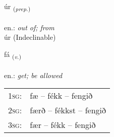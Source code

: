 \documentclass[frontgrid, backgrid]{flacards}\usepackage[]{graphicx}\usepackage[]{xcolor}
\begin{document}
\renewcommand{\blhead}{\vskip5pt {\small\bfseries\footnotesize Forsetning | Preposition }}
\renewcommand{\bcfoot}{\vskip5pt \hspace{2pt}{\small\bfseries\footnotesize 1K}}


{úr \small{\textsubscript{(\textit{prep.})}} \\[1ex]
\textphonetic{[uːr]} \\
en.: \emph{out of; from} \\  [2ex]
úr (Indeclinable)}

\renewcommand{\flhead}{\vskip5pt \fboxsep=0pt {\small\bfseries\footnotesize Sagnorð | Verb}}
\renewcommand{\fcfoot}{\vskip5pt \fboxsep=0pt \hspace{2pt}{\small\bfseries\footnotesize 1K}}

\renewcommand{\blhead}{\vskip5pt {\small\bfseries\footnotesize Sagnorð | Verb }}
\renewcommand{\bcfoot}{\vskip5pt \hspace{2pt}{\small\bfseries\footnotesize 1K}}


{fá \small{\textsubscript{(\textit{v.})}} \\[1ex] %
\textphonetic{[fauː]} \\
en.: \emph{get; be allowed} \\  [2ex]
\renewcommand*{\arraystretch}{0.8}
\begin{tabular}{p{1cm}l}
\textsc{1sg}: & fæ -- fékk -- fengið \\ 
\textsc{2sg}: & færð -- fékkst -- fengið \\ 
\textsc{3sg}: & fær -- fékk -- fengið \\ 
\end{tabular}
}


\renewcommand{\flhead}{\vskip5pt \fboxsep=0pt {\small\bfseries\footnotesize Forsetning | Preposition}}
\renewcommand{\fcfoot}{\vskip5pt \fboxsep=0pt \hspace{2pt}{\small\bfseries\footnotesize 1K}}

\renewcommand{\blhead}{\vskip5pt {\small\bfseries\footnotesize Forsetning | Preposition }}
\renewcommand{\bcfoot}{\vskip5pt \hspace{2pt}{\small\bfseries\footnotesize 1K}}
\end{document}
